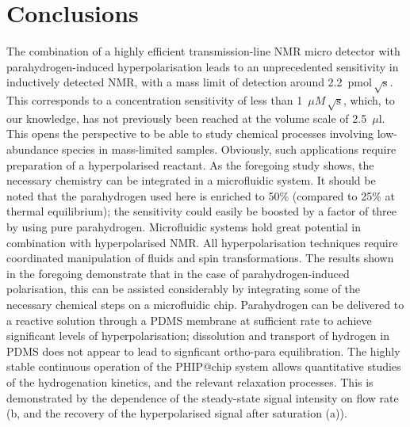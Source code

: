 \section{Conclusions}

The combination of a
highly efficient transmission-line NMR micro detector with parahydrogen-induced
hyperpolarisation leads to an unprecedented sensitivity in inductively detected
NMR, with a mass limit of detection around 2.2~$\text{pmol}\,\sqrt{\mathrm{s}}$.
This corresponds to a concentration sensitivity of less than 1~$\mu M\,\sqrt{\text{s}}$,
which, to our knowledge, has not previously been reached at the volume
scale of 2.5~$\mu$l.
This opens the perspective to be able to study chemical processes involving
low-abundance species in mass-limited samples. Obviously, such applications
require preparation of a hyperpolarised reactant. As the foregoing study shows,
the necessary chemistry can be integrated in a microfluidic system. It should be noted that the
parahydrogen used here is enriched to 50\% (compared to 25\%
at thermal equilibrium); the sensitivity
could easily be boosted by a factor of three by using pure parahydrogen.
Microfluidic systems hold great potential in combination
with hyperpolarised NMR. All hyperpolarisation techniques require coordinated
manipulation of fluids and spin transformations. The results shown in the
foregoing demonstrate that in the case of parahydrogen-induced polarisation,
this can be assisted considerably by integrating some of the necessary chemical
steps on a microfluidic chip. Parahydrogen can be delivered to a reactive
solution through a PDMS membrane at sufficient rate to achieve significant
levels of hyperpolarisation; dissolution and transport of hydrogen in PDMS does
not appear to lead to signficant ortho-para equilibration.
The highly stable continuous operation
of the PHIP@chip system allows quantitative studies
of the hydrogenation kinetics, and the relevant relaxation processes.
This is demonstrated by the dependence of the steady-state signal intensity on
flow rate (b, and the recovery of the
hyperpolarised signal after saturation (a)).

